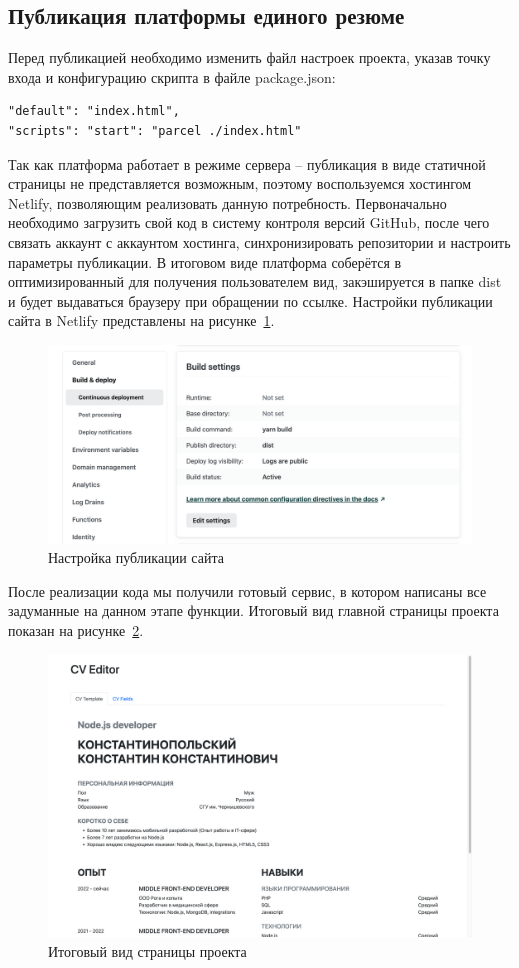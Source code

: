 \documentclass[master, och, coursework]{SCWorks}
\begin{document}
\subsection{Публикация платформы единого резюме}
Перед публикацией необходимо изменить файл настроек проекта, указав
точку входа и конфигурацию скрипта в файле package.json:
\begin{verbatim}
"default": "index.html",
"scripts": "start": "parcel ./index.html"
\end{verbatim}


Так как платформа работает в режиме сервера – публикация в виде статичной страницы
не представляется возможным, поэтому воспользуемся хостингом Netlify, позволяющим 
реализовать данную потребность. Первоначально необходимо загрузить свой код в 
систему контроля версий GitHub, после чего связать аккаунт с аккаунтом хостинга,
синхронизировать репозитории и настроить параметры публикации. В итоговом виде 
платформа соберётся в оптимизированный для получения пользователем вид, 
закэшируется в папке dist и будет выдаваться браузеру при обращении по ссылке.
Настройки публикации сайта в Netlify представлены на рисунке~\ref{fig:25}.
\begin{figure}[!ht]
    \centering
    \includegraphics[width=12cm]{images/image25.png}
    \caption{\label{fig:25}%
        Настройка публикации сайта}
\end{figure} 

После реализации кода мы получили готовый сервис, в котором написаны 
все задуманные на данном этапе функции. Итоговый вид главной страницы 
проекта показан на рисунке~\ref{fig:26}.
\begin{figure}[!ht]
    \centering
    \includegraphics[width=12cm]{images/image26.png}
    \caption{\label{fig:26}%
        Итоговый вид страницы проекта}
\end{figure} 
\end{document}
